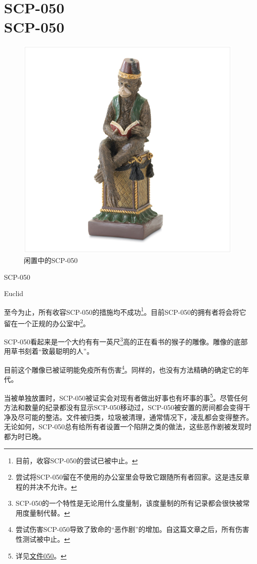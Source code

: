 \chapter[SCP-050]{
    SCP-050 \\
    SCP-050
}

\label{chap:SCP-050}

\begin{figure}[H]
    \centering
    \includegraphics[width=0.5\linewidth]{images/SCP.050.jpg}
    \caption*{闲置中的SCP-050}
\end{figure}

SCP-050

Euclid

至今为止，所有收容SCP-050的措施均不成功\footnote{目前，收容SCP-050的尝试已被中止。}。目前SCP-050的拥有者将会将它留在一个正规的办公室中\footnote{尝试将SCP-050留在不使用的办公室里会导致它跟随所有者回家。这是违反章程的并决不允许。}。

SCP-050看起来是一个大约有有一英尺\footnote{SCP-050的一个特性是无论用什么度量制，该度量制的所有记录都会很快被常用度量制代替。}高的正在看书的猴子的雕像。雕像的底部用草书刻着“致最聪明的人”。

目前这个雕像已被证明能免疫所有伤害\footnote{尝试伤害SCP-050导致了致命的“恶作剧”的增加。自这篇文章之后，所有伤害性测试被中止。}。同样的，也没有方法精确的确定它的年代。

当被单独放置时，SCP-050被证实会对现有者做出好事也有坏事的事\footnote{详见\hyperref[chap:DOC-document-050]{文件050}。}。尽管任何方法和数量的纪录都没有显示SCP-050移动过，SCP-050被安置的房间都会变得干净及尽可能的整洁。文件被归类，垃圾被清理，通常情况下，凌乱都会变得整齐。无论如何，SCP-050总有给所有者设置一个陷阱之类的做法，这些恶作剧被发现时都为时已晚。

\hr

